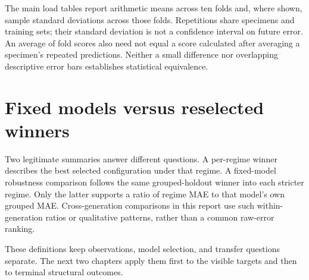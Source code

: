 The main load tables report arithmetic means across ten folds and, where shown, sample standard deviations across those folds. Repetitions share specimens and training sets; their standard deviation is not a confidence interval on future error. An average of fold scores also need not equal a score calculated after averaging a specimen's repeated predictions. Neither a small difference nor overlapping descriptive error bars establishes statistical equivalence.

\section{Fixed models versus reselected winners}
Two legitimate summaries answer different questions. A per-regime winner describes the best selected configuration under that regime. A fixed-model robustness comparison follows the same grouped-holdout winner into each stricter regime. Only the latter supports a ratio of regime MAE to that model's own grouped MAE. Cross-generation comparisons in this report use such within-generation ratios or qualitative patterns, rather than a common raw-error ranking.

These definitions keep observations, model selection, and transfer questions separate. The next two chapters apply them first to the visible targets and then to terminal structural outcomes.
